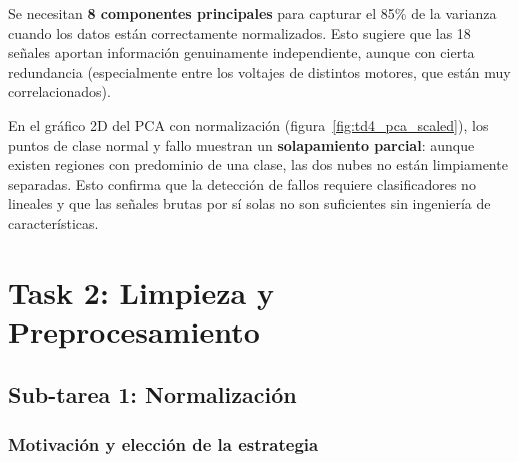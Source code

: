 \documentclass[12pt,a4paper]{article}
\begin{document}
\begin{resultbox}
Se necesitan \textbf{8 componentes principales} para capturar el 85\% de la varianza
cuando los datos están correctamente normalizados. Esto sugiere que las 18 señales
aportan información genuinamente independiente, aunque con cierta redundancia
(especialmente entre los voltajes de distintos motores, que están muy correlacionados).

En el gráfico 2D del PCA con normalización (figura~\ref{fig:td4_pca_scaled}),
los puntos de clase normal y fallo muestran un \textbf{solapamiento parcial}:
aunque existen regiones con predominio de una clase, las dos nubes no están
limpiamente separadas. Esto confirma que la detección de fallos requiere
clasificadores no lineales y que las señales brutas por sí solas no son
suficientes sin ingeniería de características.
\end{resultbox}

\section{Task 2: Limpieza y Preprocesamiento}

\subsection{Sub-tarea 1: Normalización}

\subsubsection{Motivación y elección de la estrategia}
\end{document}
